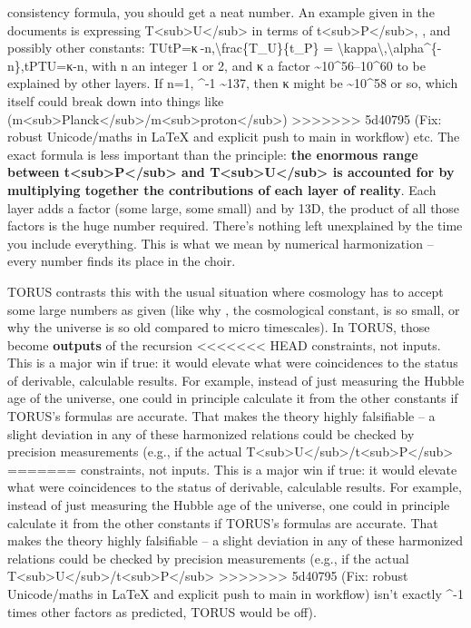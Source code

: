\documentclass[]{article}
\begin{document}
consistency formula, you should get a neat number. An example given in
the documents is expressing
T\textless{}sub\textgreater{}U\textless{}/sub\textgreater{} in terms of
t\textless{}sub\textgreater{}P\textless{}/sub\textgreater{}, \alpha, and
possibly other constants:
TUtP=κ \alpha-n,\textbackslash{}frac\{T\_U\}\{t\_P\} =
\textbackslash{}kappa\textbackslash{},\textbackslash{}alpha\^{}\{-n\},tP​TU​​=κ\alpha-n,
with n an integer 1 or 2, and κ a factor
\textasciitilde{}10\^{}56--10\^{}60 to be explained by other layers​. If
n=1, \alpha\^{}-1 \textasciitilde{}137, then κ might be
\textasciitilde{}10\^{}58 or so, which itself could break down into
things like
(m\textless{}sub\textgreater{}Planck\textless{}/sub\textgreater{}/m\textless{}sub\textgreater{}proton\textless{}/sub\textgreater{})
>>>>>>> 5d40795 (Fix: robust Unicode/maths in LaTeX and explicit push to main in workflow)
etc. The exact formula is less important than the principle: \textbf{the
enormous range between
t\textless{}sub\textgreater{}P\textless{}/sub\textgreater{} and
T\textless{}sub\textgreater{}U\textless{}/sub\textgreater{} is accounted
for by multiplying together the contributions of each layer of
reality}​. Each layer adds a factor (some large, some small) and by 13D,
the product of all those factors is the huge number required. There's
nothing left unexplained by the time you include everything. This is
what we mean by numerical harmonization -- every number finds its place
in the choir.

TORUS contrasts this with the usual situation where cosmology has to
accept some large numbers as given (like why \Lambda, the cosmological
constant, is so small, or why the universe is so old compared to micro
timescales). In TORUS, those become \textbf{outputs} of the recursion
<<<<<<< HEAD
constraints, not inputs\hspace{0pt}. This is a major win if true: it
would elevate what were coincidences to the status of derivable,
calculable results\hspace{0pt}. For example, instead of just measuring
the Hubble age of the universe, one could in principle calculate it from
the other constants if TORUS's formulas are accurate. That makes the
theory highly falsifiable -- a slight deviation in any of these
harmonized relations could be checked by precision measurements (e.g.,
if the actual
T\textless sub\textgreater U\textless/sub\textgreater/t\textless sub\textgreater P\textless/sub\textgreater{}
=======
constraints, not inputs​. This is a major win if true: it would elevate
what were coincidences to the status of derivable, calculable results​.
For example, instead of just measuring the Hubble age of the universe,
one could in principle calculate it from the other constants if TORUS's
formulas are accurate. That makes the theory highly falsifiable -- a
slight deviation in any of these harmonized relations could be checked
by precision measurements (e.g., if the actual
T\textless{}sub\textgreater{}U\textless{}/sub\textgreater{}/t\textless{}sub\textgreater{}P\textless{}/sub\textgreater{}
>>>>>>> 5d40795 (Fix: robust Unicode/maths in LaTeX and explicit push to main in workflow)
isn't exactly \alpha\^{}-1 times other factors as predicted, TORUS would be
off).
\end{document}
